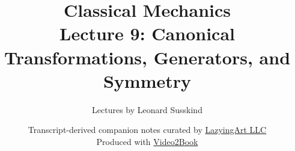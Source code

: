 \documentclass[11pt,oneside]{book}
\begin{document}
\hypersetup{pageanchor=false}
\frontmatter
\title{Classical Mechanics\\[0.45em]
\large Lecture 9: Canonical Transformations, Generators, and Symmetry}
\author{Lectures by Leonard Susskind}
\date{Transcript-derived companion notes curated by
\href{https://lazying.art}{LazyingArt LLC}\\[0.35em]
\small Produced with
\href{https://github.com/lachlanchen/Video2Book}{Video2Book}}
\maketitle
\hypersetup{pageanchor=true}
\mainmatter

\end{document}
